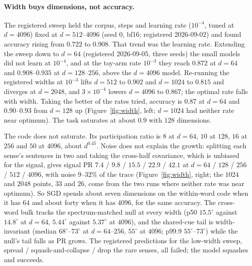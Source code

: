 \documentclass{article}
\newcommand{\degr}{^{\circ}}
\begin{document}
\paragraph{Width buys dimensions, not accuracy.} The registered sweep held the
corpus, steps and learning rate ($10^{-4}$, tuned at $d{=}4096$) fixed at
$d{=}512$--$4096$ (seed 0, bf16; registered 2026-09-02) and found accuracy rising
from $0.722$ to $0.908$. That trend was the learning rate. Extending the sweep down
to $d{=}64$ (registered 2026-09-05, three seeds) the small models did not learn at
$10^{-4}$, and at the toy-arm rate $10^{-3}$ they reach $0.872$ at $d{=}64$ and
$0.908$--$0.935$ at $d{=}128$--$256$, above the $d{=}4096$ model. Re-running the
registered widths at $10^{-3}$ lifts $d{=}512$ to $0.902$ and $d{=}1024$ to
$0.815$ and diverges at $d{=}2048$, and $3\times10^{-4}$ lowers $d{=}4096$ to
$0.867$; the optimal rate falls with width. Taking the better of the rates tried,
accuracy is $0.87$ at $d{=}64$ and $0.90$--$0.93$ from $d{=}128$ up
(Figure~\ref{fig:width}, left; $d{=}1024$ had neither rate near optimum). The
task saturates at about $0.9$ with $128$ dimensions.

The code does not saturate. Its participation ratio is $8$ at $d{=}64$, $10$ at
$128$, $16$ at $256$ and $50$ at $4096$, about $d^{0.45}$. Noise does not explain
the growth: splitting each sense's sentences in two and taking the cross-half
covariance, which is unbiased for the signal, gives signal PR $7.4$ / $9.8$ /
$15.5$ / $22.9$ / $42.1$ at $d{=}64$ / $128$ / $256$ / $512$ / $4096$, with noise
$9$--$32\%$ of the trace (Figure~\ref{fig:width}, right; the $1024$ and $2048$
points, $33$ and $26$, come from the two runs where neither rate was near optimum). So SGD
spends about seven dimensions on the within-word code when it has $64$ and about
forty when it has $4096$, for the same accuracy. The cross-word bulk tracks the
spectrum-matched null at every width (p50 $15.5\degr$ against $14.8\degr$ at
$d{=}64$, $5.44\degr$ against $5.37\degr$ at $4096$), and the shared-cue tail is
width-invariant (median $68\degr$--$73\degr$ at $d{=}64$--$256$, $55\degr$ at
$4096$; p99.9 $55\degr$--$73\degr$) while the null's tail falls as PR grows. The
registered predictions for the low-width sweep, spread / squash-and-collapse /
drop the rare senses, all failed; the model squashes and succeeds.
\end{document}
